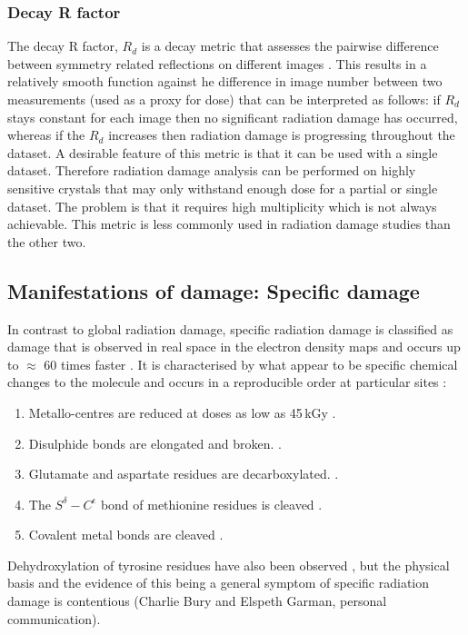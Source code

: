         \subsubsection{Decay R factor}
        \label{subs:Decay R factor}
            The decay R factor, $R_d$ is a decay metric that assesses the pairwise difference between symmetry related reflections on different images \cite{diederichs2006}.
            This results in a relatively smooth function against he difference in image number between two measurements (used as a proxy for dose) that can be interpreted as follows: if $R_d$ stays constant for each image then no significant radiation damage has occurred, whereas if the $R_d$ increases then radiation damage is progressing throughout the dataset.
            A desirable feature of this metric is that it can be used with a single dataset.
            Therefore radiation damage analysis can be performed on highly sensitive crystals that may only withstand enough dose for a partial or single dataset.
			The problem is that it requires high multiplicity which is not always achievable. This metric is less commonly used in radiation damage studies than the other two.

    \subsection{Manifestations of damage: Specific damage}
    \label{sub:Manifestations of damage: Specific damage}
        In contrast to global radiation damage, specific radiation damage is classified as damage that is observed in real space in the electron density maps and occurs up to $\approx$ 60 times faster \cite{holton2009}.
        It is characterised by what appear to be specific chemical changes to the molecule and occurs in a reproducible order at particular sites \cite{ravelli2000,weik2000,gerstel2015identifying}:
        \begin{enumerate}
            \item Metallo-centres are reduced at doses as low as 45\,kGy \cite{owen2011revealing}.
            \item Disulphide bonds are elongated and broken. \cite{burmeister2000structural,ravelli2000}.
            \item Glutamate and aspartate residues are decarboxylated. \cite{burmeister2000structural,weik2000,ravelli2000}.
            \item The $S^{\delta}-C^{\epsilon}$ bond of methionine residues is cleaved \cite{burmeister2000structural}.
            \item Covalent metal bonds are cleaved \cite{ramagopal2005radiation}.
        \end{enumerate}
        Dehydroxylation of tyrosine residues have also been observed \cite{burmeister2000structural}, but the physical basis and the evidence of this being a general symptom of specific radiation damage is contentious (Charlie Bury and Elspeth Garman, personal communication).

